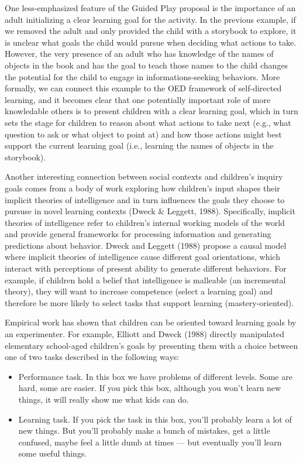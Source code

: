 \documentclass[english,man]{apa6}
\providecommand{\tightlist}{%
  \setlength{\itemsep}{0pt}\setlength{\parskip}{0pt}}
\theoremstyle{definition}
\theoremstyle{definition}
\theoremstyle{definition}
\theoremstyle{remark}
\begin{document}
One less-emphasized feature of the Guided Play proposal is the
importance of an adult initializing a clear learning goal for the
activity. In the previous example, if we removed the adult and only
provided the child with a storybook to explore, it is unclear what goals
the child would pursue when deciding what actions to take. However, the
very presence of an adult who has knowledge of the names of objects in
the book and has the goal to teach those names to the child changes the
potential for the child to engage in informations-seeking behaviors.
More formally, we can connect this example to the OED framework of
self-directed learning, and it becomes clear that one potentially
important role of more knowledable others is to present children with a
clear learning goal, which in turn sets the stage for children to reason
about what actions to take next (e.g., what question to ask or what
object to point at) and how those actions might best support the current
learning goal (i.e., learning the names of objects in the storybook).

Another interesting connection between social contexts and children's
inquiry goals comes from a body of work exploring how children's input
shapes their implicit theories of intelligence and in turn influences
the goals they choose to pursuse in novel learning contexts (Dweck \&
Leggett, 1988). Specifically, implicit theories of intelligence refer to
children's internal working models of the world and provide general
frameworks for processing information and generating predictions about
behavior. Dweck and Leggett (1988) propose a causal model where implicit
theories of intelligence cause different goal orientations, which
interact with perceptions of present ability to generate different
behaviors. For example, if children hold a belief that intelligence is
malleable (an incremental theory), they will want to increase competence
(select a learning goal) and therefore be more likely to select tasks
that support learning (mastery-oriented).

Empirical work has shown that children can be oriented toward learning
goals by an experimenter. For example, Elliott and Dweck (1988) directly
manipulated elementary school-aged children's goals by presenting them
with a choice between one of two tasks described in the following ways:

\begin{itemize}
\tightlist
\item
  Performance task. In this box we have problems of different levels.
  Some are hard, some are easier. If you pick this box, although you
  won't learn new things, it will really show me what kids can do.
\item
  Learning task. If you pick the task in this box, you'll probably learn
  a lot of new things. But you'll probably make a bunch of mistakes, get
  a little confused, maybe feel a little dumb at times --- but
  eventually you'll learn some useful things.
\end{itemize}
\end{document}
